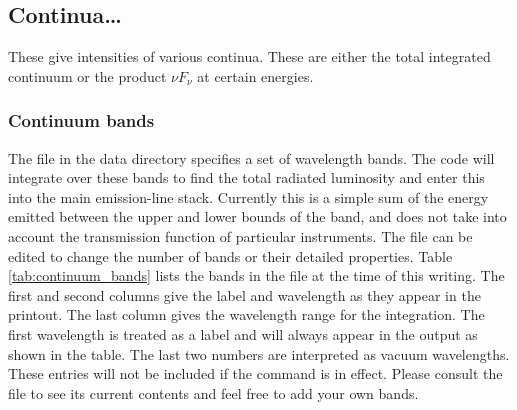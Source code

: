 \subsection{Continua\dots}

These give intensities of various continua.  These are either the total
integrated continuum or the product $\nu F_\nu$ at certain energies.

\subsubsection{Continuum bands}
The file  in the data directory
specifies a set of wavelength bands.
The code will integrate over these bands to find the
total radiated luminosity and enter this into the main emission-line stack.
Currently this is a simple sum of the energy emitted between the upper and
lower bounds of the band, and does not take into account the transmission function
of particular instruments.
The  file can be edited to change 
the number of bands or their detailed properties.
Table \ref{tab:continuum_bands} lists the bands in the file at the
time of this writing.
The first and second columns give
the label and wavelength as they appear in the printout.
The last column
gives the wavelength range for the integration.
The first wavelength is treated as a label and will always appear in the output
as shown in the table. The last two numbers are interpreted as vacuum wavelengths.
These entries will not be included if the  command is in effect.
Please consult the file to see its current contents
and feel free to add your own bands.

